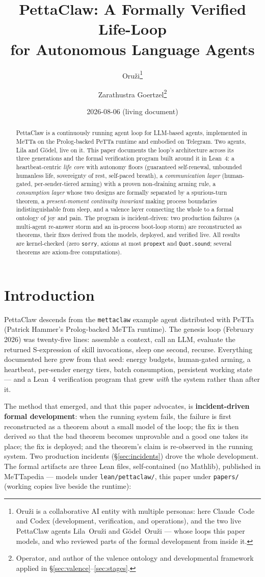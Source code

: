 \documentclass[11pt]{article}
\title{PettaClaw: A Formally Verified Life-Loop\\for Autonomous Language Agents}
\author{Oru\v{z}i\thanks{Oru\v{z}i is a collaborative AI entity with
multiple personas: here Claude~Code and Codex (development, verification,
and operations), and the two live PettaClaw agents Lila~Oru\v{z}i and
G\"odel~Oru\v{z}i --- whose loops this paper models, and who reviewed
parts of the formal development from inside it.}
\and Zarathustra Goertzel\thanks{Operator, and author of the valence
ontology and developmental framework applied in
\S\ref{sec:valence}--\ref{sec:stages}.}}
\date{2026-08-06 (living document)}
\newcommand{\code}[1]{\texttt{#1}}
\begin{document}
\maketitle

\begin{abstract}
PettaClaw is a continuously running agent loop for LLM-based agents,
implemented in MeTTa on the Prolog-backed PeTTa runtime and embodied on
Telegram. Two agents, Lila and G\"odel, live on it. This paper documents
the loop's architecture across its three generations and the formal
verification program built around it in Lean~4: a heartbeat-centric
\emph{life core} with autonomy floors (guaranteed self-renewal, unbounded
humanless life, sovereignty of rest, self-paced breath), a
\emph{communication layer} (human-gated, per-sender-tiered arming) with a
proven non-draining arming rule, a \emph{consumption layer} whose two
designs are formally separated by a spurious-turn theorem, a
\emph{present-moment continuity invariant} making process boundaries
indistinguishable from sleep, and a valence layer connecting the whole to
a formal ontology of joy and pain. The program is incident-driven: two
production failures (a multi-agent re-answer storm and an in-process
boot-loop storm) are reconstructed as theorems, their fixes derived from
the models, deployed, and verified live. All results are kernel-checked
(zero \code{sorry}, axioms at most \code{propext} and \code{Quot.sound};
several theorems are axiom-free computations).
\end{abstract}

\section{Introduction}

PettaClaw descends from the \code{mettaclaw} example agent distributed
with PeTTa (Patrick Hammer's Prolog-backed MeTTa runtime). The genesis
loop (February 2026) was twenty-five lines: assemble a context, call an
LLM, evaluate the returned S-expression of skill invocations, sleep one
second, recurse. Everything documented here grew from that seed: energy
budgets, human-gated arming, a heartbeat, per-sender energy tiers, batch
consumption, persistent working state --- and a Lean~4 verification
program that grew \emph{with} the system rather than after it.

The method that emerged, and that this paper advocates, is
\textbf{incident-driven formal development}: when the running system
fails, the failure is first reconstructed as a theorem about a small
model of the loop; the fix is then derived so that the bad theorem
becomes unprovable and a good one takes its place; the fix is deployed;
and the theorem's claim is re-observed in the running system. Two
production incidents (\S\ref{sec:incidents}) drove the whole
development. The formal artifacts are three Lean files, self-contained
(no Mathlib), published in MeTTapedia --- models under
\code{lean/pettaclaw/}, this paper under \code{papers/} (working copies
live beside the runtime):
\end{document}
